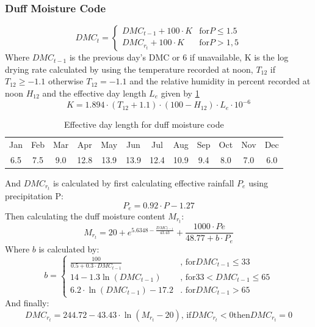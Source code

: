\documentclass[twocolumn,10pt]{article}
\begin{document}
\subsubsection*{Duff Moisture Code}
\begin{equation}
\label{eqn:dmc1}
    DMC_{t} = 
    \begin{cases}
        DMC_{t-1} + 100 \cdot K & \text{for} P \leq 1.5 \\
        DMC_{r_{t}} + 100 \cdot K & \text{for} P > 1,5
    \end{cases}
\end{equation}
Where $DMC_{t-1}$ is the previous day's DMC or 6 if unavailable, K is the log drying rate calculated by using the temperature recorded at noon, $T_{12}$ if $T_{12} \geq -1.1$ otherwise $T_{12} = -1.1$ and the relative humidity in percent recorded at noon $H_{12}$ and the effective day length $L_{e}$ given by \ref{tab:eff_day}
\begin{equation}
\label{eqn:dmc2}
    K = 1.894 \cdot (T_{12} + 1.1) \cdot (100 - H_{12}) \cdot L_{e} \cdot 10^{-6}
\end{equation}
\begin{table}[!h]
    \centering
    \begin{tabular}{c|c|c|c|c|c|c|c|c|c|c|c}
        Jan & Feb & Mar & Apr & May & Jun & Jul & Aug & Sep & Oct & Nov & Dec  \\
        6.5 & 7.5 & 9.0 & 12.8 & 13.9 & 13.9 & 12.4 & 10.9 & 9.4 & 8.0 & 7.0 & 6.0
    \end{tabular}
    \caption{Effective day length for duff moisture code}
    \label{tab:eff_day}
\end{table}
And $DMC_{r_{t}}$ is calculated by first calculating effective rainfall $P_{e}$ using precipitation P:
\begin{equation}
\label{eqn:dmc3}
    P_{e} = 0.92 \cdot P - 1.27
\end{equation}
Then calculating the duff moisture content $M_{r_{t}}$:
\begin{equation}
\label{eqn:dmc4}
    M_{r_{t}} = 20 + e^{5.6348 - \frac{DMC_{t-1}}{43.43}} + \frac{1000 \cdot P{e}}{48.77 + b \cdot P_{e}}
\end{equation}
Where $b$ is calculated by:
\begin{equation}
\label{eqn:dmc5}
    b = 
    \begin{cases}
        \frac{100}{0.5 + 0.3 \cdot DMC_{t-1}} & \text{, for} DMC_{t-1} \leq 33 \\
        14 - 1.3 \ln(DMC_{t-1}) & \text{, for} 33 < DMC_{t-1} \leq 65 \\
        6.2 \cdot \ln(DMC_{t-1}) - 17.2 & \text{. for} DMC_{t-1} > 65
    \end{cases}
\end{equation}
And finally:
\begin{equation}
\label{eqn:dmc6}
    DMC_{r_{t}} = 244.72 - 43.43 \cdot \ln (M_{r_{t}} - 20) \text{, if} DMC_{r_{t}} < 0 \text{then} DMC_{r_{t}} = 0
\end{equation}
\end{document}
